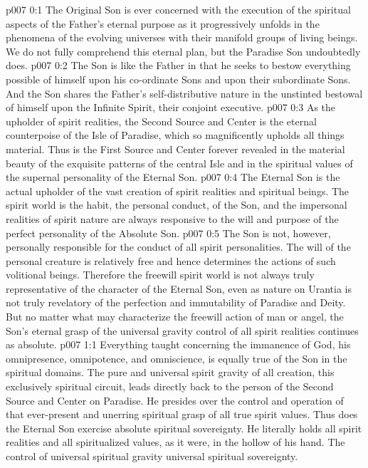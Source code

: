 \author{Divine Counselor}
\vs p007 0:1 The Original Son is ever concerned with the execution of the spiritual aspects of the Father’s eternal purpose as it progressively unfolds in the phenomena of the evolving universes with their manifold groups of living beings. We do not fully comprehend this eternal plan, but the Paradise Son undoubtedly does.
\vs p007 0:2 The Son is like the Father in that he seeks to bestow everything possible of himself upon his co\hyp{}ordinate Sons and upon their subordinate Sons. And the Son shares the Father’s self\hyp{}distributive nature in the unstinted bestowal of himself upon the Infinite Spirit, their conjoint executive.
\pc \vs p007 0:3 As the upholder of spirit realities, the Second Source and Center is the eternal counterpoise of the Isle of Paradise, which so magnificently upholds all things material. Thus is the First Source and Center forever revealed in the material beauty of the exquisite patterns of the central Isle and in the spiritual values of the supernal personality of the Eternal Son.
\pc \vs p007 0:4 The Eternal Son is the actual upholder of the vast creation of spirit realities and spiritual beings. The spirit world is the habit, the personal conduct, of the Son, and the impersonal realities of spirit nature are always responsive to the will and purpose of the perfect personality of the Absolute Son.
\vs p007 0:5 The Son is not, however, personally responsible for the conduct of all spirit personalities. The will of the personal creature is relatively free and hence determines the actions of such volitional beings. Therefore the freewill spirit world is not always truly representative of the character of the Eternal Son, even as nature on Urantia is not truly revelatory of the perfection and immutability of Paradise and Deity. But no matter what may characterize the freewill action of man or angel, the Son’s eternal grasp of the universal gravity control of all spirit realities continues as absolute.
\vs p007 1:1 Everything taught concerning the immanence of God, his omnipresence, omnipotence, and omniscience, is equally true of the Son in the spiritual domains. The pure and universal spirit gravity of all creation, this exclusively spiritual circuit, leads directly back to the person of the Second Source and Center on Paradise. He presides over the control and operation of that ever\hyp{}present and unerring spiritual grasp of all true spirit values. Thus does the Eternal Son exercise absolute spiritual sovereignty. He literally holds all spirit realities and all spiritualized values, as it were, in the hollow of his hand. The control of universal spiritual gravity  universal spiritual sovereignty.
